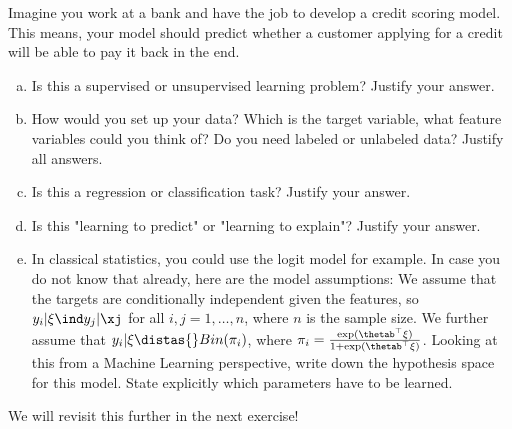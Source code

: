 Imagine you work at a bank and have the job to develop a credit scoring model. This means, your model should predict whether a customer applying for a credit will be able to pay it back in the end.

\begin{enumerate}[a)]

\item Is this a supervised or unsupervised learning problem? Justify your answer.
\item How would you set up your data? Which is the target variable, what feature variables could you think of? Do you need labeled or unlabeled data? Justify all answers.
\item Is this a regression or classification task? Justify your answer.
\item Is this "learning to predict" or "learning to explain"? Justify your answer.
\item In classical statistics, you could use the logit model for example. In case you do not know that already, here are the model assumptions: We assume that the targets are conditionally independent given the features, so $y_i|\xi \ind y_j|\xj$ for all $i,j = 1, \dots, n$, where $n$ is the sample size. We further assume that $y_i|\xi \distas{} Bin(\pi_i)$, where $\pi_i = \frac{\exp(\thetab^\top\xi)}{1+\exp(\thetab^\top\xi)}$.
Looking at this from a Machine Learning perspective, write down the hypothesis space for this model. State explicitly which parameters have to be learned.

\end{enumerate}

We will revisit this further in the next exercise!

